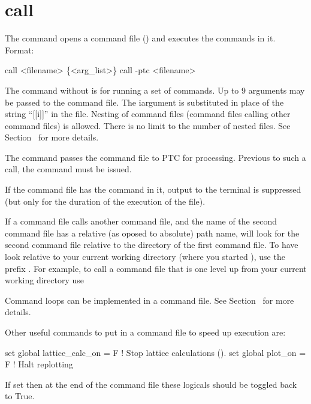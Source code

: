 \section{call}
\label{s:call}

The  command opens a command file () and executes the
commands in it.  Format:
\begin{example}
  call <filename> \{<arg_list>\}  \Strut
  call -ptc <filename>
\end{example}

\vskip 10pt 
The  command without  is for running a set of \tao commands.  Up to 9
arguments may be passed to the command file. The i\Th argument is substituted in place of
the string ``[[i]]'' in the file. Nesting of command files (command files calling other
command files) is allowed. There is no limit to the number of nested files.  See
Section~ for more details.

The  command passes the command file to PTC for processing. Previous to such
a call, the command  must be issued.

If the command file has the  command in it, output to the terminal is suppressed (but
only for the duration of the execution of the file).

If a command file calls another command file, and the name of the second command file has a relative
(as oposed to absolute) path name, \tao will look for the second command file relative to the
directory of the first command file. To have \tao look relative to your current working directory
(where you started \tao), use the prefix . For example, to call a command file that is
one level up from your current working directory use

Command loops can be implemented in a command file. See Section~ for more details.

Other useful commands to put in a command file to speed up execution are:
\begin{example}
  set global lattice_calc_on = F   ! Stop lattice calculations ().
  set global plot_on = F           ! Halt replotting
\end{example}
If set then at the end of the command file these logicals should be toggled back to True.

